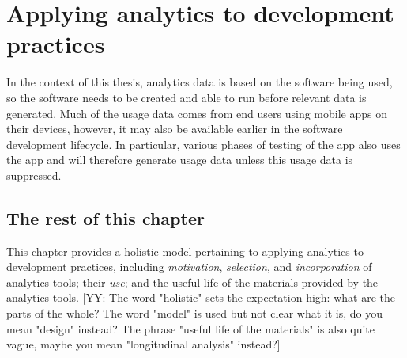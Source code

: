 \chapter{Applying analytics to development practices}
\label{chapter-applying-analytics-to-development-practices}

\def\yy#1{\color{blue}[YY: #1]\color{black}}

In the context of this thesis, analytics data is based on the software being used, so the software needs to be created and able to run before relevant data is generated. 
Much of the usage data comes from end users using mobile apps on their devices, however, it may also be available earlier in the software development lifecycle. In particular, various phases of testing of the app also uses the app and will therefore generate usage data unless this usage data is suppressed. 

\section{The rest of this chapter}
This chapter provides a holistic model pertaining to applying analytics to development practices, including \href{motivation-section}{\textit{motivation}}, \textit{selection}, and \textit{incorporation} of analytics tools; their \textit{use}; and the useful life of the materials provided by the analytics tools. 
\yy{The word "holistic" sets the expectation high: what are the parts of the whole? The word "model" is used but not clear what it is, do you mean "design" instead? The phrase "useful life of the materials" is also quite vague, maybe you mean "longitudinal analysis" instead?}


